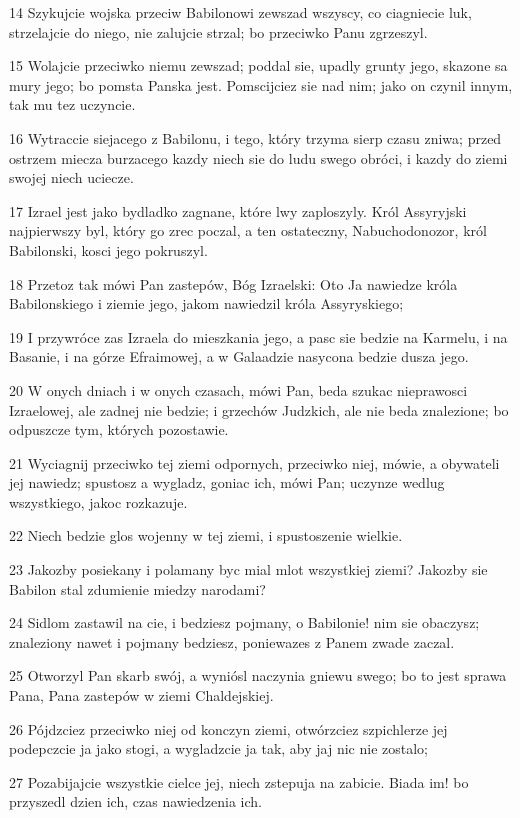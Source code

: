 \par 14 Szykujcie wojska przeciw Babilonowi zewszad wszyscy, co ciagniecie luk, strzelajcie do niego, nie zalujcie strzal; bo przeciwko Panu zgrzeszyl.
\par 15 Wolajcie przeciwko niemu zewszad; poddal sie, upadly grunty jego, skazone sa mury jego; bo pomsta Panska jest. Pomscijciez sie nad nim; jako on czynil innym, tak mu tez uczyncie.
\par 16 Wytraccie siejacego z Babilonu, i tego, który trzyma sierp czasu zniwa; przed ostrzem miecza burzacego kazdy niech sie do ludu swego obróci, i kazdy do ziemi swojej niech uciecze.
\par 17 Izrael jest jako bydladko zagnane, które lwy zaploszyly. Król Assyryjski najpierwszy byl, który go zrec poczal, a ten ostateczny, Nabuchodonozor, król Babilonski, kosci jego pokruszyl.
\par 18 Przetoz tak mówi Pan zastepów, Bóg Izraelski: Oto Ja nawiedze króla Babilonskiego i ziemie jego, jakom nawiedzil króla Assyryskiego;
\par 19 I przywróce zas Izraela do mieszkania jego, a pasc sie bedzie na Karmelu, i na Basanie, i na górze Efraimowej, a w Galaadzie nasycona bedzie dusza jego.
\par 20 W onych dniach i w onych czasach, mówi Pan, beda szukac nieprawosci Izraelowej, ale zadnej nie bedzie; i grzechów Judzkich, ale nie beda znalezione; bo odpuszcze tym, których pozostawie.
\par 21 Wyciagnij przeciwko tej ziemi odpornych, przeciwko niej, mówie, a obywateli jej nawiedz; spustosz a wygladz, goniac ich, mówi Pan; uczynze wedlug wszystkiego, jakoc rozkazuje.
\par 22 Niech bedzie glos wojenny w tej ziemi, i spustoszenie wielkie.
\par 23 Jakozby posiekany i polamany byc mial mlot wszystkiej ziemi? Jakozby sie Babilon stal zdumienie miedzy narodami?
\par 24 Sidlom zastawil na cie, i bedziesz pojmany, o Babilonie! nim sie obaczysz; znaleziony nawet i pojmany bedziesz, poniewazes z Panem zwade zaczal.
\par 25 Otworzyl Pan skarb swój, a wyniósl naczynia gniewu swego; bo to jest sprawa Pana, Pana zastepów w ziemi Chaldejskiej.
\par 26 Pójdzciez przeciwko niej od konczyn ziemi, otwórzciez szpichlerze jej podepczcie ja jako stogi, a wygladzcie ja tak, aby jaj nic nie zostalo;
\par 27 Pozabijajcie wszystkie cielce jej, niech zstepuja na zabicie. Biada im! bo przyszedl dzien ich, czas nawiedzenia ich.
